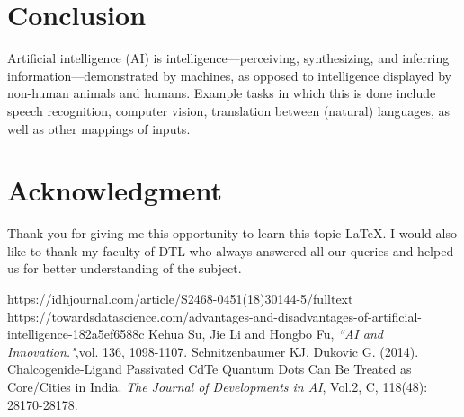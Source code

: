 \documentclass[conference]{IEEEtran}
\begin{document}
\section{Conclusion}
Artificial intelligence (AI) is intelligence—perceiving, synthesizing, and inferring information—demonstrated by machines, as opposed to intelligence displayed by non-human animals and humans. Example tasks in which this is done include speech recognition, computer vision, translation between (natural) languages, as well as other mappings of inputs.\\


\section*{Acknowledgment}
Thank you for giving me this opportunity to learn this topic \LaTeX. I would also like to thank my faculty of DTL who always answered all our queries and helped us for better understanding of the subject.


\begin{thebibliography}{100} 
\bibitem{}https://idhjournal.com/article/S2468-0451(18)30144-5/fulltext
\bibitem{} https://towardsdatascience.com/advantages-and-disadvantages-of-artificial-intelligence-182a5ef6588c
\bibitem{} Kehua Su, Jie Li and Hongbo Fu, \emph{“AI and Innovation."},vol.  136, 1098-1107. 
 Schnitzenbaumer KJ, Dukovic G. (2014). Chalcogenide-Ligand  Passivated  CdTe  Quantum  Dots  Can  Be Treated  as  Core/Cities in India.  \emph{The Journal  of Developments in AI}, Vol.2, C, 118(48): 28170-28178. 
\end{thebibliography}
\end{document}
